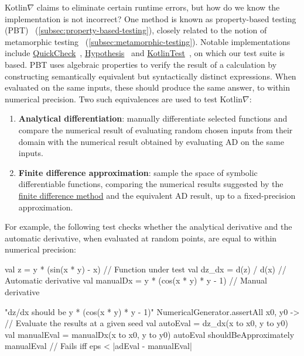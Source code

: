 Kotlin$\nabla$ claims to eliminate certain runtime errors, but how do we know the implementation is not incorrect? One method is known as property-based testing (PBT)~\citep{fink1997property} (\autoref{subsec:property-based-testing}), closely related to the notion of metamorphic testing~\citep{chen1998metamorphic} (\autoref{subsec:metamorphic-testing}). Notable implementations include \href{http://www.cse.chalmers.se/~rjmh/QuickCheck/manual.html}{QuickCheck}~\citep{claessen2011quickcheck}, \href{https://hypothesis.readthedocs.io/en/latest/}{Hypothesis}~\citep{Hypothesis} and \href{https://github.com/kotlintest/kotlintest}{KotlinTest}~\citep{kotlintest}, on which our test suite is based. PBT uses algebraic properties to verify the result of a calculation by constructing semantically equivalent but syntactically distinct expressions. When evaluated on the same inputs, these should produce the same answer, to within numerical precision. Two such equivalences are used to test Kotlin$\nabla$: \\
%
\begin{enumerate}
    \item \textbf{Analytical differentiation}: manually differentiate selected functions and compare the numerical result of evaluating random chosen inputs from their domain with the numerical result obtained by evaluating AD on the same inputs.
    \item \textbf{Finite difference approximation}: sample the space of symbolic differentiable functions, comparing the numerical results suggested by the \hyperref[sec:fdm]{finite difference method} and the equivalent AD result, up to a fixed-precision approximation. \\
\end{enumerate}
%
For example, the following test checks whether the analytical derivative and the automatic derivative, when evaluated at random points, are equal to within numerical precision:
%
\begin{kotlinlisting}
val z = y * (sin(x * y) - x)            // Function under test
val dz_dx = d(z) / d(x)                 // Automatic derivative
val manualDx = y * (cos(x * y) * y - 1) // Manual derivative

"dz/dx should be y * (cos(x * y) * y - 1)" {
    NumericalGenerator.assertAll { x0, y0 ->
    // Evaluate the results at a given seed
    val autoEval = dz_dx(x to x0, y to y0)
        val manualEval = manualDx(x to x0, y to y0)
        autoEval shouldBeApproximately manualEval // Fails iff eps < |adEval - manualEval|
    }
}
\end{kotlinlisting}
